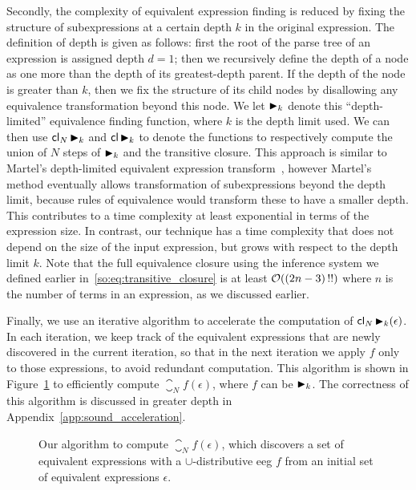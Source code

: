 Secondly, the complexity of equivalent expression finding is reduced by
fixing the structure of subexpressions at a certain depth $k$ in the original
expression.  The definition of depth is given as follows: first the root of
the parse tree of an expression is assigned depth $d = 1$; then we recursively
define the depth of a node as one more than the depth of its greatest-depth
parent.  If the depth of the node is greater than $k$, then we fix the
structure of its child nodes by disallowing any equivalence transformation
beyond this node. We let $\operatorname{\blacktriangleright}_k$ denote this ``depth-limited'' equivalence
finding function, where $k$ is the depth limit used.  We can then use
$\operatorname{\mathsf{cl}}_N \operatorname{\blacktriangleright}_k$ and $\operatorname{\mathsf{cl}} \operatorname{\blacktriangleright}_k$ to denote the functions to
respectively compute the union of $N$ steps of $\operatorname{\blacktriangleright}_k$ and the transitive
closure. This approach is similar to Martel's depth-limited equivalent
expression transform~\cite{martel07}, however Martel's method eventually allows
transformation of subexpressions beyond the depth limit, because rules of
equivalence would transform these to have a smaller depth.  This contributes
to a time complexity at least exponential in terms of the expression size. In
contrast, our technique has a time complexity that does not depend on the size
of the input expression, but grows with respect to the depth limit $k$. Note
that the full equivalence closure using the inference system we defined earlier
in~\eqref{so:eq:transitive_closure} is at least $\operatorname{\mathcal{O}}((2n - 3)\,!!)$ where $n$
is the number of terms in an expression, as we discussed earlier.

Finally, we use an iterative algorithm to accelerate the computation of
$\operatorname{\mathsf{cl}}_N \operatorname{\blacktriangleright}_k (\epsilon)$.  In each iteration, we keep track
of the equivalent expressions that are newly discovered in the current
iteration, so that in the next iteration we apply $f$ only to those
expressions, to avoid redundant computation.  This algorithm is shown in
Figure~\ref{so:alg:closure} to efficiently compute $\closure_N f(\epsilon)$,
where $f$ can be $\operatorname{\blacktriangleright}_k$.  The correctness of this algorithm is discussed
in greater depth in Appendix~\ref{app:sound_acceleration}.
\begin{figure}[ht]
    \centering
    \begin{algorithmic}
        \singlespacing%
                \EndIf{}
            \EndFor{}
        \EndFunction{}
    \end{algorithmic}
    \caption{%
        Our algorithm to compute $\closure_N f (\epsilon)$, which discovers a
        set of equivalent expressions with a $\cup$-distributive \acrshort{eeg}
        $f$ from an initial set of equivalent expressions $\epsilon$.
    }\label{so:alg:closure}
\end{figure}


